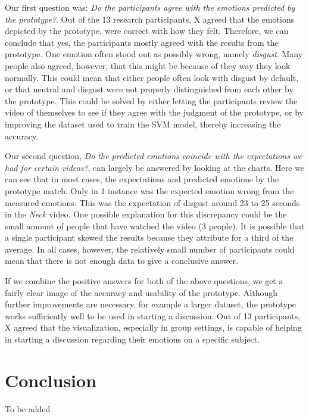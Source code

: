 \documentclass[sigconf]{acmart}
\begin{document}
Our first question was: \emph{Do the participants agree with the emotions predicted by the prototype?}.
Out of the 13 research participants, X agreed that the emotions depicted by the prototype, were correct with
how they felt. Therefore, we can conclude that yes, the participants mostly agreed with the results from the
prototype. One emotion often stood out as possibly wrong, namely \emph{disgust}. Many people also agreed,
however, that this might be because of they way they look normally. This could mean that either people often
look with disgust by default, or that neutral and disgust were not properly distinguished from each other by
the prototype. This could be solved by either letting the participants review the video of themselves to see
if they agree with the judgment of the prototype, or by improving the dataset used to train the SVM model,
thereby increasing the accuracy.

Our second question, \emph{Do the predicted emotions coincide with the expectations we had for certain videos?},
can largely be answered by looking at the charts. Here we can see that in most cases, the expectations and
predicted emotions by the prototype match. Only in 1 instance was the expected emotion wrong from the measured
emotions. This was the expectation of disgust around 23 to 25 seconds in the \emph{Neck} video. One possible
explanation for this discrepancy could be the small amount of people that have watched the video (3 people). 
It is possible that a single participant skewed the results because they attribute for a third of the average.
In all cases, however, the relatively small number of participants could mean that there is not enough data to
give a conclusive answer.

If we combine the positive answers for both of the above questions, we get a fairly clear image of the accuracy
and usability of the prototype. Although further improvements are necessary, for example a larger dataset,
the prototype works sufficiently well to be used in starting a discussion. Out of 13 participants, X agreed that
the visualization, especially in group settings, is capable of helping in starting a discussion regarding their
emotions on a specific subject.


\section{Conclusion}
To be added
\end{document}
